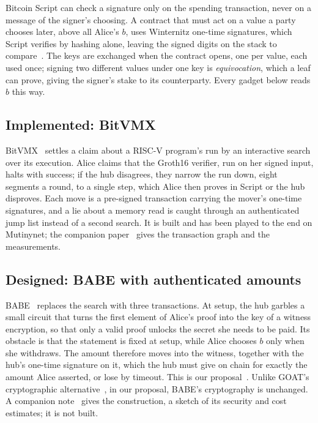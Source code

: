 \documentclass[11pt]{article}
\begin{document}
Bitcoin Script can check a signature only on the spending transaction,
never on a message of the signer's choosing. A contract that must act on
a value a party chooses later, above all Alice's $b$, uses Winternitz
one-time signatures, which Script verifies by hashing alone, leaving the
signed digits on the stack to compare~\cite{bitvm,bitvmx}. The keys are
exchanged when the contract opens, one per value, each used once;
signing two different values under one key is \emph{equivocation},
which a leaf can prove, giving the signer's stake to its counterparty.
Every gadget below reads $b$ this way.

\subsection{Implemented: BitVMX}

BitVMX~\cite{bitvmx} settles a claim about a RISC-V program's run by an
interactive search over its execution. Alice claims that the Groth16
verifier, run on her signed input, halts with success; if the hub
disagrees, they narrow the run down, eight segments a round, to a single
step, which Alice then proves in Script or the hub disproves. Each move
is a pre-signed transaction carrying the mover's one-time signatures,
and a lie about a memory read is caught through an authenticated jump
list instead of a second search. It is built and has been played to the
end on Mutinynet; the companion paper~\cite{lichenbitvmx} gives the
transaction graph and the measurements.

\subsection{Designed: BABE with authenticated amounts}

BABE~\cite{babe} replaces the search with three transactions. At setup,
the hub garbles a small circuit that turns the first element of Alice's
proof into the key of a witness encryption, so that only a valid proof
unlocks the secret she needs to be paid. Its obstacle is that the
statement is fixed at setup, while Alice chooses $b$ only when she
withdraws. The amount therefore moves into the witness, together with
the hub's one-time signature on it, which the hub must give on chain for
exactly the amount Alice asserted, or lose by timeout. This is our
proposal~\cite{delving}. Unlike GOAT's cryptographic
alternative~\cite{goat}, in our proposal, BABE's cryptography is unchanged. A companion note~\cite{lichenbabe} gives the construction, a sketch of its security and cost estimates; it is not built.
\end{document}
